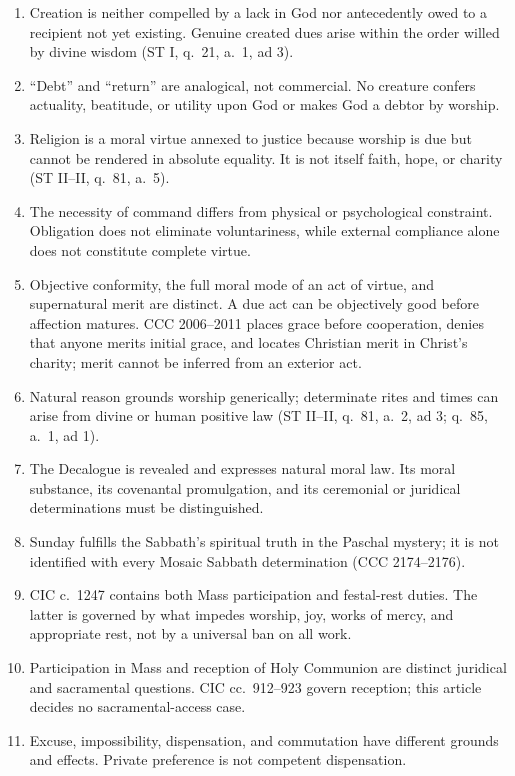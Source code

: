 \begin{enumerate}[leftmargin=1.45em,itemsep=0.25em]
\item Creation is neither compelled by a lack in God nor antecedently owed to a recipient not yet existing. Genuine created dues arise within the order willed by divine wisdom (ST I, q.~21, a.~1, ad 3).
\item ``Debt'' and ``return'' are analogical, not commercial. No creature confers actuality, beatitude, or utility upon God or makes God a debtor by worship.
\item Religion is a moral virtue annexed to justice because worship is due but cannot be rendered in absolute equality. It is not itself faith, hope, or charity (ST II--II, q.~81, a.~5).
\item The necessity of command differs from physical or psychological constraint. Obligation does not eliminate voluntariness, while external compliance alone does not constitute complete virtue.
\item Objective conformity, the full moral mode of an act of virtue, and supernatural merit are distinct. A due act can be objectively good before affection matures. CCC 2006--2011 places grace before cooperation, denies that anyone merits initial grace, and locates Christian merit in Christ's charity; merit cannot be inferred from an exterior act.
\item Natural reason grounds worship generically; determinate rites and times can arise from divine or human positive law (ST II--II, q.~81, a.~2, ad 3; q.~85, a.~1, ad 1).
\item The Decalogue is revealed and expresses natural moral law. Its moral substance, its covenantal promulgation, and its ceremonial or juridical determinations must be distinguished.
\item Sunday fulfills the Sabbath's spiritual truth in the Paschal mystery; it is not identified with every Mosaic Sabbath determination (CCC 2174--2176).
\item CIC c.~1247 contains both Mass participation and festal-rest duties. The latter is governed by what impedes worship, joy, works of mercy, and appropriate rest, not by a universal ban on all work.
\item Participation in Mass and reception of Holy Communion are distinct juridical and sacramental questions. CIC cc.~912--923 govern reception; this article decides no sacramental-access case.
\item Excuse, impossibility, dispensation, and commutation have different grounds and effects. Private preference is not competent dispensation.

\end{enumerate}
